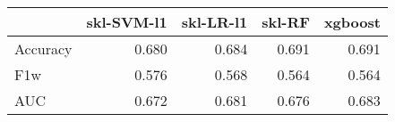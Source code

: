 \begin{tabular}{lrrrr}
\toprule
{} &  skl-SVM-l1 &  skl-LR-l1 &  skl-RF &  xgboost \\
\midrule
Accuracy &       0.680 &      0.684 &   0.691 &    0.691 \\
F1w      &       0.576 &      0.568 &   0.564 &    0.564 \\
AUC      &       0.672 &      0.681 &   0.676 &    0.683 \\
\bottomrule
\end{tabular}
